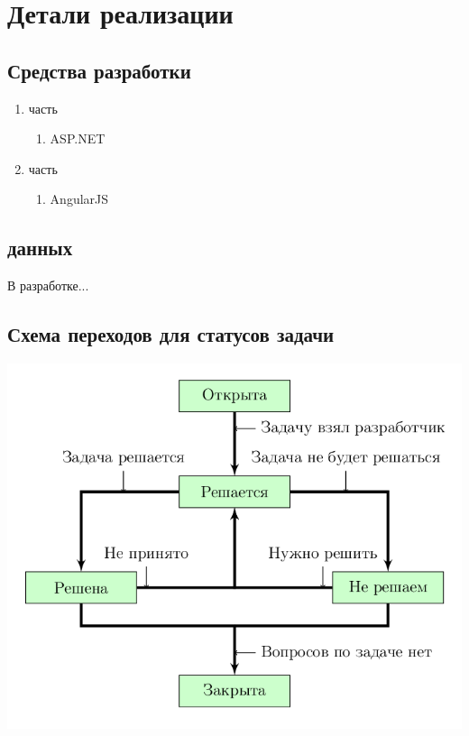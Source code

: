 \documentclass[14pt,a4paper]{extarticle}
\begin{document}
	
	\section {Детали реализации}
	\subsection {Средства разработки}
	\begin{enumerate}
		\item { часть}
		\begin{enumerate}
			\item ASP.NET
		\end{enumerate}
		
		\item { часть}
		\begin{enumerate}
			\item AngularJS
		\end{enumerate}
	\end{enumerate}
		
	\subsection { данных}
	В разработке...
			
	\subsection {Схема переходов для статусов задачи}
	\begin{center}
		\includegraphics[scale=0.5]{res/TransitionScheme/TransitionScheme.png} 
	\end{center}
			
\end{document}
